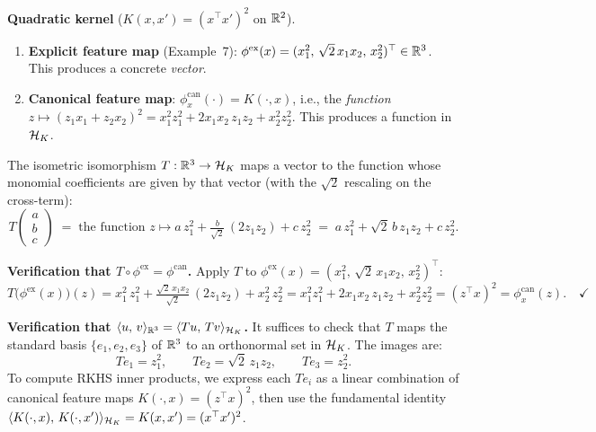 \begin{notechapter}
\begin{insightbox}
\medskip
\textbf{Quadratic kernel}
($K(x,x') = (x^\top x')^2$ on $\mathbb{R}^2$).
\begin{enumerate}
  \item \textbf{Explicit feature map}
    (Example~7):
    $\phi^{\mathrm{ex}}(x) =
    (x_1^2,\, \sqrt{2}\,x_1 x_2,\, x_2^2)^\top
    \in \mathbb{R}^3$.
    This produces a concrete \emph{vector}.
  \item \textbf{Canonical feature map}:
    $\phi_x^{\mathrm{can}}(\cdot) = K(\cdot, x)$,
    i.e., the \emph{function}
    $z \mapsto (z_1 x_1 + z_2 x_2)^2
    = x_1^2 z_1^2 + 2x_1 x_2\, z_1 z_2
    + x_2^2 z_2^2$.
    This produces a function in $\mathcal{H}_K$.
\end{enumerate}
The isometric isomorphism $T: \mathbb{R}^3 \to \mathcal{H}_K$ maps
a vector to the function whose monomial coefficients
are given by that vector (with the $\sqrt{2}$
rescaling on the cross-term):
\[
T\!\begin{pmatrix} a \\ b \\ c \end{pmatrix}
\;=\; \text{the function } z \mapsto
a\,z_1^2 + \tfrac{b}{\sqrt{2}}\,(2z_1 z_2)
+ c\,z_2^2
\;=\; a\,z_1^2 + \sqrt{2}\,b\, z_1 z_2
+ c\,z_2^2.
\]

\textbf{Verification that
$T \circ \phi^{\mathrm{ex}} = \phi^{\mathrm{can}}$.}
Apply $T$ to $\phi^{\mathrm{ex}}(x) =
(x_1^2,\, \sqrt{2}\,x_1 x_2,\, x_2^2)^\top$:
\[
T\!\bigl(\phi^{\mathrm{ex}}(x)\bigr)(z)
= x_1^2\, z_1^2
+ \tfrac{\sqrt{2}\,x_1 x_2}{\sqrt{2}}\,(2z_1 z_2)
+ x_2^2\, z_2^2
= x_1^2 z_1^2 + 2x_1 x_2\, z_1 z_2
+ x_2^2 z_2^2
= (z^\top x)^2 = \phi_x^{\mathrm{can}}(z).
\quad\checkmark
\]

\textbf{Verification that $\langle u,\, v \rangle_{\mathbb{R}^3} =
\langle Tu,\, Tv \rangle_{\mathcal{H}_K}$.} It suffices to check that $T$
maps the standard basis $\{e_1, e_2, e_3\}$ of $\mathbb{R}^3$
to an orthonormal set in $\mathcal{H}_K$. The images are:
\[
Te_1 = z_1^2, \qquad
Te_2 = \sqrt{2}\,z_1 z_2, \qquad
Te_3 = z_2^2.
\]
To compute RKHS inner products, we express each $Te_i$
as a linear combination of canonical feature maps
$K(\cdot, x) = (z^\top x)^2$, then use the fundamental
identity
$\langle K(\cdot,x),\, K(\cdot,x') \rangle_{\mathcal{H}_K} = K(x,x')
= (x^\top x')^2$.


\end{insightbox}
\end{notechapter}
